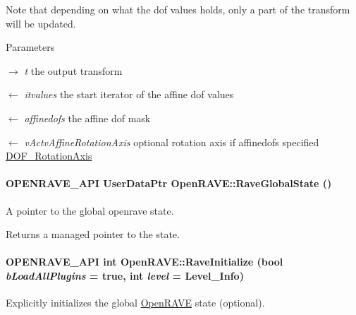 Note that depending on what the dof values holds, only a part of the transform will be updated. 
\begin{DoxyParams}{Parameters}
\item[\mbox{$\rightarrow$} {\em t}]the output transform \item[\mbox{$\leftarrow$} {\em itvalues}]the start iterator of the affine dof values \item[\mbox{$\leftarrow$} {\em affinedofs}]the affine dof mask \item[\mbox{$\leftarrow$} {\em vActvAffineRotationAxis}]optional rotation axis if affinedofs specified \hyperlink{namespaceOpenRAVE_a3016e2185103f3c1bdc5e4482893ca98a5ee6baa8acb92c310cbc1ece082640d0}{DOF\_\-RotationAxis} \end{DoxyParams}
\hypertarget{namespaceOpenRAVE_ac3c20e38f24dedcd46add394fd8074fb}{
\paragraph[{RaveGlobalState}]{\setlength{\rightskip}{0pt plus 5cm}OPENRAVE\_\-API UserDataPtr OpenRAVE::RaveGlobalState ()}\hfill}
\label{namespaceOpenRAVE_ac3c20e38f24dedcd46add394fd8074fb}


A pointer to the global openrave state. 

\begin{DoxyReturn}{Returns}
a managed pointer to the state. 
\end{DoxyReturn}
\hypertarget{namespaceOpenRAVE_a85619ef1740cd97d7dcb5ef306243a75}{
\paragraph[{RaveInitialize}]{\setlength{\rightskip}{0pt plus 5cm}OPENRAVE\_\-API int OpenRAVE::RaveInitialize (bool {\em bLoadAllPlugins} = {\ttfamily true}, \/  int {\em level} = {\ttfamily Level\_\-Info})}\hfill}
\label{namespaceOpenRAVE_a85619ef1740cd97d7dcb5ef306243a75}


Explicitly initializes the global \hyperlink{namespaceOpenRAVE}{OpenRAVE} state (optional). 

